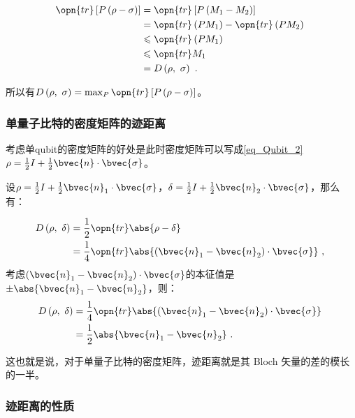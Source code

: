 \begin{equation}
\begin{aligned}
\opn{tr} \left[ P\left(\rho - \sigma\right) \right] &= \opn{tr}\left[ P\left(M_1 - M_2\right) \right] \\
&= \opn{tr}\left(PM_1\right) - \opn{tr}\left(PM_2\right) \\
&\leqslant \opn{tr}\left(PM_1\right) \\
&\leqslant \opn{tr}M_1 \\
&= D\left( \rho,~\sigma \right)~.
\end{aligned}~
\end{equation}

所以有$D\left(\rho,~\sigma\right) = \max_{ P } \opn{tr}\left[P\left(\rho - \sigma\right)\right]$。

\subsubsection{单量子比特的密度矩阵的迹距离}

考虑单qubit的密度矩阵的好处是此时密度矩阵可以写成\autoref{eq_Qubit_2}~$\rho = \frac{1}{2}I + \frac{1}{2}\bvec{n}\cdot \bvec{\sigma}$。

设$\rho = \frac{1}{2}I + \frac{1}{2}\bvec{n}_1\cdot \bvec{\sigma}$，$\delta = \frac{1}{2}I + \frac{1}{2}\bvec{n}_2\cdot \bvec{\sigma}$，那么有：

\begin{equation}
\begin{aligned}
D\left(\rho,~\delta\right) &= \frac{1}{2}\opn{tr}\abs{\rho - \delta} \\
&= \frac{1}{4}\opn{tr}\abs{\left(\bvec{n}_1 - \bvec{n}_2\right) \cdot \bvec{\sigma}}~,
\end{aligned}~
\end{equation}
考虑$\left(\bvec{n}_1 - \bvec{n}_2\right) \cdot \bvec{\sigma}$的本征值是$\pm \abs{\bvec{n}_1 - \bvec{n}_2}$，则：
\begin{equation}
\begin{aligned}
D\left(\rho,~\delta\right) 
&= \frac{1}{4}\opn{tr}\abs{\left(\bvec{n}_1 - \bvec{n}_2\right) \cdot \bvec{\sigma}} \\ 
&= \frac{1}{2}\abs{\bvec{n}_1 - \bvec{n}_2}~.
\end{aligned}~
\end{equation}

这也就是说，对于单量子比特的密度矩阵，迹距离就是其 Bloch 矢量的差的模长的一半。

\subsubsection{迹距离的性质}

